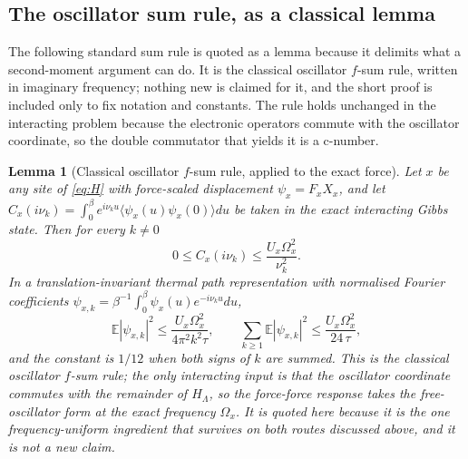 \documentclass[11pt]{article}
\newtheorem{lemma}[theorem]{Lemma}
\theoremstyle{definition}
\theoremstyle{remark}
\newcommand{\E}{\mathbb{E}}
\begin{document}
\subsection{The oscillator sum rule, as a classical lemma}

The following standard sum rule is quoted as a lemma because it delimits what a
second-moment argument can do. It is the classical oscillator $f$-sum rule, written
in imaginary frequency; nothing new is claimed for it, and the short proof is included
only to fix notation and constants. The rule holds unchanged in the interacting
problem because the electronic operators commute with the oscillator coordinate, so
the double commutator that yields it is a c-number.

\begin{lemma}[Classical oscillator $f$-sum rule, applied to the exact force]
\label{lem:fsum}
Let $x$ be any site of \eqref{eq:H} with force-scaled displacement
$\psi_x=F_xX_x$, and let
$C_x(i\nu_k)=\int_0^\beta e^{i\nu_ku}\langle\psi_x(u)\psi_x(0)\rangle du$ be taken in
the exact interacting Gibbs state. Then for every $k\ne0$
\begin{equation}
0\le C_x(i\nu_k)\le\frac{U_x\Omega_x^2}{\nu_k^2}.
\label{eq:fsum}
\end{equation}
In a translation-invariant thermal path representation with normalised Fourier
coefficients $\psi_{x,k}=\beta^{-1}\int_0^\beta\psi_x(u)e^{-i\nu_ku}du$,
\begin{equation}
\E|\psi_{x,k}|^2\le\frac{U_x\Omega_x^2}{4\pi^2k^2\tau},\qquad
\sum_{k\ge1}\E|\psi_{x,k}|^2\le\frac{U_x\Omega_x^2}{24\,\tau},
\label{eq:fsum2}
\end{equation}
and the constant is $1/12$ when both signs of $k$ are summed. This is the
classical oscillator $f$-sum rule; the only interacting input is that the oscillator
coordinate commutes with the remainder of $H_\Lambda$, so the force-force response
takes the free-oscillator form at the exact frequency $\Omega_x$. It is quoted here
because it is the one frequency-uniform ingredient that survives on both routes
discussed above, and it is not a new claim.
\end{lemma}
\end{document}

